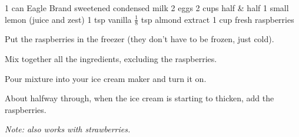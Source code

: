 \dishtype{}
\begin{ingreds}
    1 can Eagle Brand\textsuperscript{\textregistered} sweetened condensed milk
    2 eggs
    2 cups half \& half
    1 small lemon (juice and zest)
    1 tsp vanilla
    $\frac{1}{8}$ tsp almond extract
    1 cup fresh raspberries
\end{ingreds}
\begin{method}
    Put the raspberries in the freezer (they don’t have to be frozen, just cold).\par
    Mix together all the ingredients, excluding the raspberries.\par
    Pour mixture into your ice cream maker and turn it on.\par
    About halfway through, when the ice cream is starting to thicken, add the raspberries.\par
    \emph{Note: also works with strawberries.}
\end{method}